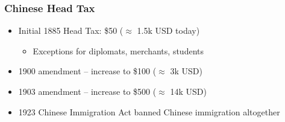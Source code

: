 \documentclass[xcolor=dvipsnames, compress, 12pt, aspectratio=169, handout]{beamer}
\begin{document}
    


\begin{frame}
    \frametitle{Chinese Head Tax}
    \label{headtaxinfo}
    \begin{itemize}
        \item Initial 1885 Head Tax: \$50 ($\approx$ 1.5k USD today)
        \begin{itemize}
            \vspace{1mm}
            \item Exceptions for diplomats, merchants, students 
        \end{itemize}
        \vspace{2mm}
        \item 1900 amendment -- increase to \$100 ($\approx$ 3k USD) \vspace{2mm}
        \item 1903 amendment -- increase to \$500 ($\approx$ 14k USD) \vspace{2mm}
        \item 1923 Chinese Immigration Act banned Chinese immigration altogether
    \end{itemize}
    \vspace{2mm}
    \centering 
    \hyperlink{fig_headtax}{} \hyperlink{figa1_tax}{}
    \hyperlink{figa1_taxpayer}{}
\end{frame}

\end{document}
